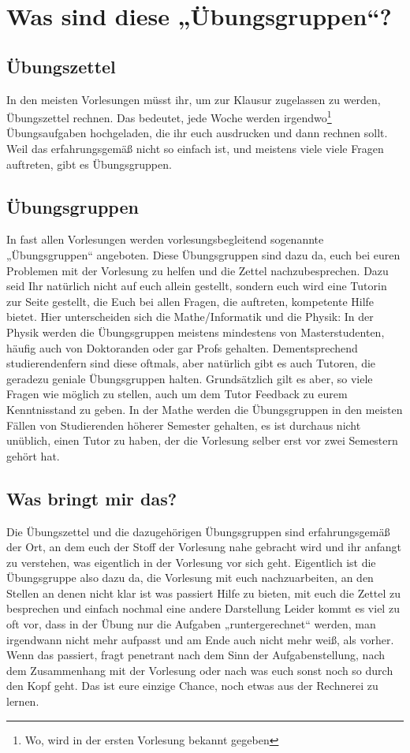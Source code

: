 \section{Was sind diese „Übungsgruppen“?}

\subsection{Übungszettel}
In den meisten Vorlesungen müsst ihr, um zur Klausur zugelassen zu werden,
Übungszettel rechnen. Das bedeutet, jede Woche werden irgendwo\footnote{Wo, wird
in der ersten Vorlesung bekannt gegeben} Übungsaufgaben hochgeladen, die ihr
euch ausdrucken und dann rechnen sollt. Weil das erfahrungsgemäß nicht so
einfach ist, und meistens viele viele Fragen auftreten, gibt es Übungsgruppen.

\subsection{Übungsgruppen}
In fast allen Vorlesungen werden vorlesungsbegleitend sogenannte „Übungsgruppen“
angeboten. Diese Übungsgruppen sind dazu da, euch bei euren Problemen mit der
Vorlesung zu helfen und die Zettel nachzubesprechen.
Dazu seid Ihr natürlich nicht auf euch allein gestellt, sondern euch wird eine
Tutorin zur Seite gestellt, die Euch bei allen Fragen, die auftreten, kompetente
Hilfe bietet.
Hier unterscheiden sich die Mathe/Informatik und die Physik: In der Physik
werden die Übungsgruppen meistens mindestens von Masterstudenten, häufig auch
von Doktoranden oder gar Profs gehalten. Dementsprechend studierendenfern sind
diese oftmals, aber natürlich gibt es auch Tutoren, die geradezu geniale
Übungsgruppen halten.
Grundsätzlich gilt es aber, so viele Fragen wie möglich zu stellen, auch um
dem Tutor Feedback zu eurem Kenntnisstand zu geben.
In der Mathe werden die Übungsgruppen in den meisten Fällen von Studierenden
höherer Semester gehalten, es ist durchaus nicht unüblich, einen Tutor zu
haben, der die Vorlesung selber erst vor zwei Semestern gehört hat.

\subsection{Was bringt mir das?}
Die Übungszettel und die dazugehörigen Übungsgruppen sind erfahrungsgemäß der
Ort, an dem euch der Stoff der Vorlesung nahe gebracht wird und ihr anfangt zu
verstehen, was eigentlich in der Vorlesung vor sich geht.
Eigentlich ist die Übungsgruppe also dazu da, die Vorlesung mit euch
nachzuarbeiten, an den Stellen an denen nicht klar ist was passiert Hilfe zu
bieten, mit euch die Zettel zu besprechen und einfach nochmal eine andere
Darstellung
Leider kommt es viel zu oft vor, dass in der Übung nur die Aufgaben
„runtergerechnet“ werden, man irgendwann nicht mehr aufpasst und am Ende auch
nicht mehr weiß, als vorher.  Wenn das passiert, fragt penetrant nach dem Sinn
der Aufgabenstellung, nach dem Zusammenhang mit der Vorlesung oder nach was
euch sonst noch so durch den Kopf geht. Das ist eure einzige Chance, noch etwas
aus der Rechnerei zu lernen.

